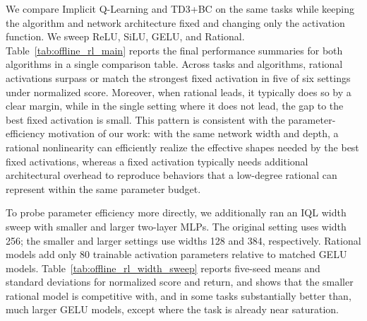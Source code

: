 \documentclass{article}
\theoremstyle{plain}
\theoremstyle{definition}
\theoremstyle{remark}
\begin{document}
We compare Implicit Q-Learning \cite{kostrikov2021iql} and TD3+BC \cite{fujimoto2021td3bc} on the same tasks while keeping the algorithm and network architecture fixed and changing only the activation function. We sweep ReLU, SiLU, GELU, and Rational.  {Table~\ref*{tab:offline_rl_main} reports the final performance summaries for both algorithms in a single comparison table.} Across tasks and algorithms, rational activations surpass or match the strongest fixed activation in five of six settings under normalized score. Moreover, when rational leads, it typically does so by a clear margin, while in the single setting where it does not lead, the gap to the best fixed activation is small. This pattern is consistent with the parameter-efficiency motivation of our work: with the same network width and depth, a rational nonlinearity can efficiently realize the effective shapes needed by the best fixed activations, whereas a fixed activation typically needs additional architectural overhead to reproduce behaviors that a low-degree rational can represent within the same parameter budget.

To probe parameter efficiency more directly, we additionally ran an IQL width sweep with smaller and larger two-layer MLPs. The original setting uses width 256; the smaller and larger settings use widths 128 and 384, respectively. Rational models add only 80 trainable activation parameters relative to matched GELU models. Table~\ref*{tab:offline_rl_width_sweep} reports five-seed means and standard deviations for normalized score and return, and shows that the smaller rational model is competitive with, and in some tasks substantially better than, much larger GELU models, except where the task is already near saturation.
\end{document}
